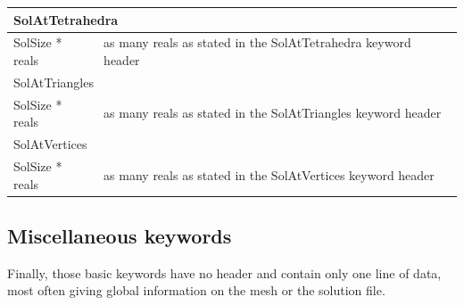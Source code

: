 \documentclass[a4paper,12pt]{article}
\begin{document}
\begin{longtable}{|m{4cm}|m{11cm}|}
\multicolumn{2}{|l|}{SolAtTetrahedra} \\
\hline
SolSize * reals & as many reals as stated in the SolAtTetrahedra keyword header \\
\hline\hline

\multicolumn{2}{|l|}{SolAtTriangles} \\
\hline
SolSize * reals & as many reals as stated in the SolAtTriangles keyword header \\
\hline\hline

\multicolumn{2}{|l|}{SolAtVertices} \\
\hline
SolSize * reals & as many reals as stated in the SolAtVertices keyword header \\
\hline

\end{longtable}


\subsection{Miscellaneous keywords}

Finally, those basic keywords have no header and contain only one line of data, most often giving global information on the mesh or the solution file.
\end{document}
